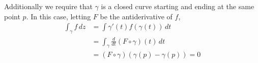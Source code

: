 \documentclass{homework}
\begin{document}
                                                                                                      \begin{solution}
                                                                                                      Additionally we require that $\gamma$ is a closed curve starting and ending at the same point $p$. In this case, letting $F$ be the antiderivative of $f$,
                                                                                                      \begin{align*}
                                                                                                      \int_\gamma f \, dz 
                                                                                                      &= \int \gamma'(t)f(\gamma(t)) \, dt \\
                                                                                                      &= \int_\gamma \frac{d}{dt}(F\circ\gamma)(t) \, dt\\
                                                                                                      &= (F\circ\gamma)(\gamma(p) - \gamma(p)) = 0
                                                                                                      \end{align*}
                                                                                                      \end{solution}
\end{document}
